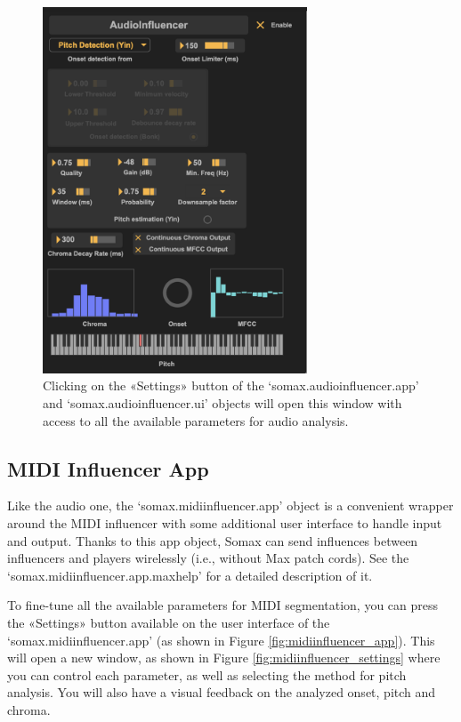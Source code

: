  \begin{figure}[H]
    \centering        
 	\includegraphics[width=0.7\textwidth, keepaspectratio]{img/audioinfluencer_settings.png}
    \caption{Clicking on the «Settings» button of the `somax.audioinfluencer.app' and `somax.audioinfluencer.ui' objects will open this window with access to all the available parameters for audio analysis.}
    \label{fig:audioinfluencer_settings}
\end{figure}

\subsection{MIDI Influencer App}

Like the audio one, the `somax.midiinfluencer.app' object is a convenient wrapper around the MIDI influencer with some additional user interface to handle input and output. Thanks to this app object, Somax can send influences between influencers and players wirelessly (i.e., without Max patch cords). 
See the `somax.midiinfluencer.app.maxhelp' for a detailed description of it. 

To fine-tune all the available parameters for MIDI segmentation, you can press the  «Settings» button available on the user interface of the `somax.midiinfluencer.app' (as shown in Figure \ref{fig:midiinfluencer_app}). This will open a new window, as shown in Figure \ref{fig:midiinfluencer_settings} where you can control each parameter, as well as selecting the method for pitch analysis. You will also have a visual feedback on the analyzed onset, pitch and chroma.



